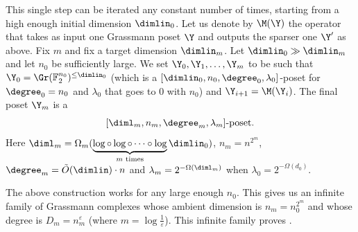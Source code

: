 \medskip
%


This single step can be iterated any constant number of times, starting from a high enough initial dimension \(\dimlin_0\). Let us denote by \(\M(\Y)\) the operator that takes as input one Grassmann poset \(\Y\) and outputs the sparser one \(\Y'\) as above. Fix \(m\) and fix a target dimension \(\dimlin_m\). Let \(\dimlin_0 \gg \dimlin_m\) and let \(n_0\) be sufficiently large. We set \(\Y_0,\Y_1,\dots,\Y_m\) to be such that \(\Y_0 = \Gr(\mathbb{F}_2^{n_0})^{\leq \dimlin_0}\) (which is a $[\dimlin_0,n_0,\degree_0,\lambda_0]$-poset for \(\degree_0=n_0\) and \(\lambda_0\) that goes to \(0\) with \(n_0\)) and \(\Y_{i+1} = \M(\Y_i)\). The final poset \(\Y_m\) is a 
\[ [\diml_m ,n_m,\degree_m,\lambda_m]\text{-poset.}\]
Here \(\diml_m = \Omega_m(\underbrace{\log \circ \log \circ \dots \circ \log }_{m \text{ times}} \dimlin_0)\), \(n_m=n^{2^m}\), \(\degree_m = \Tilde{O}(\dimlin) \cdot n\) and \(\lambda_m = 2^{-\Omega(\diml_m)}\) when \(\lambda_0 = 2^{-\Omega(d_0)}\).


The above construction works for any large enough \(n_0\). This gives us an infinite family of Grassmann complexes whose ambient dimension is \(n_m=n_0^{2^m}\) and whose degree is \(D_m = n_m^{\varepsilon}\) (where \(m=\log \frac{1}{\varepsilon}\)).  This infinite family proves .

